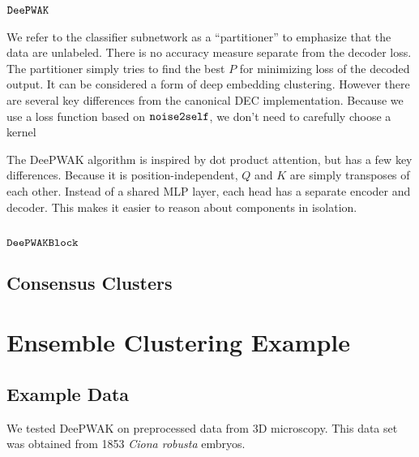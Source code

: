

\subsection{$\mathop{\mathtt{DeePWAK}}\limits$}
\label{app:DeePWAK}

We refer to the classifier subnetwork as a ``partitioner'' to emphasize that the data are unlabeled.
There is no accuracy measure separate from the decoder loss.
The partitioner simply tries to find the best $P$ for minimizing loss of the decoded output.
It can be considered a form of deep embedding clustering\cite{xie2016unsupervised}.
However there are several key differences from the canonical DEC implementation.
Because we use a loss function based on $\mathop{\mathtt{noise2self}}\limits$, we don't need to carefully choose a kernel

The DeePWAK algorithm is inspired by dot product attention, but has a few key differences.
Because it is position-independent, $Q$ and $K$ are simply transposes of each other.
Instead of a shared MLP layer, each head has a separate encoder and decoder.
This makes it easier to reason about components in isolation.





\subsection{$\mathop{\mathtt{DeePWAKBlock}}\limits$}





\subsection{Consensus Clusters}
\label{app:consensus}

\section{Ensemble Clustering Example}
\label{app:ensemble}

\subsection{Example Data}
We tested DeePWAK on preprocessed data from 3D microscopy.
This data set was obtained from 1853 \textit{Ciona robusta} embryos.

